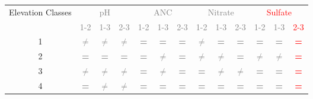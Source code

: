 \begin{table}\scriptsize
\begin{center}
\begin{tabular}{ccccccccccccc}
\toprule
 \multicolumn{1}{p{1cm}}{Elevation Classes}& \multicolumn{ 3}{c}{\textcolor{gray}{pH}} & \multicolumn{ 3}{c}{\textcolor{gray}{ANC}} & \multicolumn{ 3}{c}{\textcolor{gray}{Nitrate}} & \multicolumn{ 3}{c}{\textcolor{red}{Sulfate}} \\ \cline{2-13}\noalign{\smallskip}
 & \multicolumn{ 1}{c}{\textcolor{gray}{1-2}} & \textcolor{gray}{1-3} & \textcolor{gray}{2-3} & \textcolor{gray}{1-2} & \textcolor{gray}{1-3} & \textcolor{gray}{2-3} & \textcolor{gray}{1-2} & \textcolor{gray}{1-3} & \textcolor{gray}{2-3} & \textcolor{gray}{1-2} & \textcolor{gray}{1-3} & \textcolor{red}{2-3} \\  \cline{2-13}
\multicolumn{1}{c}{1} & \textcolor{gray}{\textbf{$\neq$}} & \textcolor{gray}{\textbf{$\neq$}} & \textcolor{gray}{\textbf{$\neq$}} & \textcolor{gray}{\textbf{=}} & \textcolor{gray}{\textbf{=}} & \textcolor{gray}{\textbf{=}} & \textcolor{gray}{\textbf{$\neq$}} & \textcolor{gray}{\textbf{=}} & \textcolor{gray}{\textbf{=}} & \textcolor{gray}{\textbf{=}} & \textcolor{gray}{\textbf{=}} & \textcolor{red}{\textbf{=}} \\ 
\multicolumn{1}{c}{2} & \textcolor{gray}{\textbf{=}} & \textcolor{gray}{\textbf{=}} & \textcolor{gray}{\textbf{=}} & \textcolor{gray}{\textbf{=}} & \textcolor{gray}{\textbf{$\neq$}} & \textcolor{gray}{\textbf{=}} & \textcolor{gray}{\textbf{$\neq$}} & \textcolor{gray}{\textbf{$\neq$}} & \textcolor{gray}{\textbf{=}} & \textcolor{gray}{\textbf{$\neq$}} & \textcolor{gray}{\textbf{$\neq$}} & \textcolor{red}{\textbf{=}} \\ 
\multicolumn{1}{c}{3} & \textcolor{gray}{\textbf{$\neq$}} & \textcolor{gray}{\textbf{$\neq$}} & \textcolor{gray}{\textbf{$\neq$}} & \textcolor{gray}{\textbf{=}} & \textcolor{gray}{\textbf{$\neq$}} & \textcolor{gray}{\textbf{=}} & \textcolor{gray}{\textbf{=}} & \textcolor{gray}{\textbf{$\neq$}} & \textcolor{gray}{\textbf{$\neq$}} & \textcolor{gray}{\textbf{=}} & \textcolor{gray}{\textbf{=}} & \textcolor{red}{\textbf{=}} \\ 
\multicolumn{1}{c}{4} & \textcolor{gray}{\textbf{=}} & \textcolor{gray}{\textbf{$\neq$}} & \textcolor{gray}{\textbf{$\neq$}} & \textcolor{gray}{\textbf{=}} & \textcolor{gray}{\textbf{=}} & \textcolor{gray}{\textbf{=}} & \textcolor{gray}{\textbf{=}} & \textcolor{gray}{\textbf{=}} & \textcolor{gray}{\textbf{=}} & \textcolor{gray}{\textbf{=}} & \textcolor{gray}{\textbf{=}} & \textcolor{red}{\textbf{=}} \\ 

\end{tabular}
\end{center}
\end{table}
